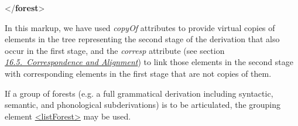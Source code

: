 \begin{shaded}
\hspace*{1em}\hspace*{1em}\hspace*{1em}\mbox{}\newline 
\hspace*{1em}\hspace*{1em}\mbox{}\newline 
\hspace*{1em}\mbox{}\newline 
{}\mbox{}\newline 
{</\textbf{forest}>}\end{shaded}\egroup\par \par
In this markup, we have used {\itshape copyOf} attributes to provide virtual copies of elements in the tree representing the second stage of the derivation that also occur in the first stage, and the {\itshape corresp} attribute (see section \textit{\hyperref[SACS]{16.5.\ Correspondence and Alignment}}) to link those elements in the second stage with corresponding elements in the first stage that are not copies of them.\par
If a group of forests (e.g. a full grammatical derivation including syntactic, semantic, and phonological subderivations) is to be articulated, the grouping element \hyperref[TEI.listForest]{<listForest>} may be used.
